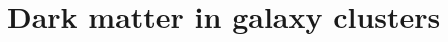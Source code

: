 \documentclass[12pt]{report}
\begin{document}





%


%

\section{Dark matter in galaxy clusters}



{}

\end{document}
